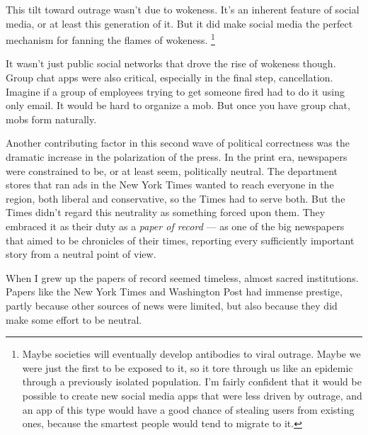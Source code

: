 This tilt toward outrage wasn't due to wokeness. It's an inherent
feature of social media, or at least this generation of it. But it did
make social media the perfect mechanism for fanning the flames of
wokeness. \footnote{Maybe societies will eventually develop antibodies to viral
outrage. Maybe we were just the first to be exposed to it, so it tore
through us like an epidemic through a previously isolated population.
I'm fairly confident that it would be possible to create new social
media apps that were less driven by outrage, and an app of this type
would have a good chance of stealing users from existing ones, because
the smartest people would tend to migrate to it.}

It wasn't just public social networks that drove the rise of wokeness
though. Group chat apps were also critical, especially in the final
step, cancellation. Imagine if a group of employees trying to get
someone fired had to do it using only email. It would be hard to
organize a mob. But once you have group chat, mobs form naturally.

Another contributing factor in this second wave of political correctness
was the dramatic increase in the polarization of the press. In the print
era, newspapers were constrained to be, or at least seem, politically
neutral. The department stores that ran ads in the New York Times wanted
to reach everyone in the region, both liberal and conservative, so the
Times had to serve both. But the Times didn't regard this neutrality as
something forced upon them. They embraced it as their duty as a
\emph{paper of record} --- as one of the big newspapers that aimed to be
chronicles of their times, reporting every sufficiently important story
from a neutral point of view.

When I grew up the papers of record seemed timeless, almost sacred
institutions. Papers like the New York Times and Washington Post had
immense prestige, partly because other sources of news were limited, but
also because they did make some effort to be neutral.

